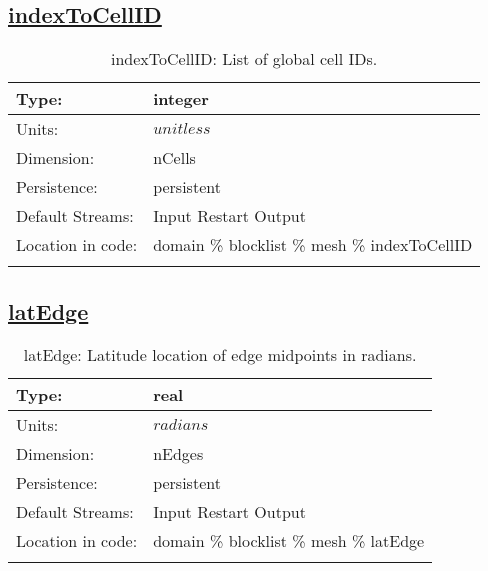 \subsection[indexToCellID]{\hyperref[sec:var_tab_mesh]{indexToCellID}}
\label{subsec:var_sec_mesh_indexToCellID}
\begin{center}
\begin{longtable}{| p{2.0in} | p{4.0in} |}
        \hline 
        Type: & integer \\
        \hline 
        Units: & $unitless$ \\
        \hline 
        Dimension: & nCells \\
        \hline 
        Persistence: & persistent \\
        \hline 
		 Default Streams: & Input Restart Output  \\
        \hline 
		 Location in code: & domain \% blocklist \% mesh \% indexToCellID \\
		 \hline 
    \caption{indexToCellID: List of global cell IDs.}
\end{longtable}
\end{center}
\subsection[latEdge]{\hyperref[sec:var_tab_mesh]{latEdge}}
\label{subsec:var_sec_mesh_latEdge}
\begin{center}
\begin{longtable}{| p{2.0in} | p{4.0in} |}
        \hline 
        Type: & real \\
        \hline 
        Units: & $radians$ \\
        \hline 
        Dimension: & nEdges \\
        \hline 
        Persistence: & persistent \\
        \hline 
		 Default Streams: & Input Restart Output  \\
        \hline 
		 Location in code: & domain \% blocklist \% mesh \% latEdge \\
		 \hline 
    \caption{latEdge: Latitude location of edge midpoints in radians.}
\end{longtable}
\end{center}
